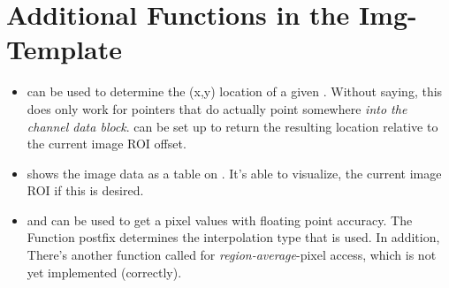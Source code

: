 \section{Additional Functions in the Img-Template\label{sec:further-img-functions}}
\begin{itemize}
\item {} can be used to determine the (x,y) location of a given . Without saying, this does only work for pointers that do actually point somewhere \emph{into the channel data block}.  can be set up to return the resulting location relative to the current image ROI offset. 
\item {} shows the image data as a table on . It's able to visualize, the current image ROI if this is desired.
\item {} and  can be used to get a pixel values with floating point accuracy. The Function postfix determines the interpolation type that is used. In addition, There's another function called  for \emph{region-average}-pixel access, which is not yet implemented (correctly).
\end{itemize}






